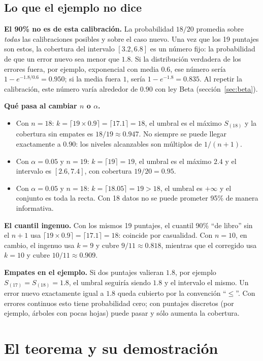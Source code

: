 \documentclass[11pt]{article}
\theoremstyle{plain}
\theoremstyle{definition}
\theoremstyle{remark}
\newcommand{\dest}[1]{\par\needspace{4\baselineskip}\textbf{#1}\quad}
\newcommand{\lamina}[1]{}%
\begin{document}
\subsection{Lo que el ejemplo no dice}
\dest{El 90\% no es de esta calibración.} La probabilidad $18/20$ promedia sobre \emph{todas} las
calibraciones posibles y sobre el caso nuevo. Una vez que los 19 puntajes son estos, la cobertura del
intervalo $[3.2,6.8]$ es un número fijo: la probabilidad de que un error nuevo sea menor que $1.8$.
Si la distribución verdadera de los errores fuera, por ejemplo, exponencial con media $0.6$, ese
número sería $1-e^{-1.8/0.6}=0.950$; si la media fuera $1$, sería $1-e^{-1.8}=0.835$. Al repetir la
calibración, este número varía alrededor de $0.90$ con ley Beta (sección~\ref{sec:beta}).

\dest{Qué pasa al cambiar $n$ o $\alpha$.}
\begin{itemize}
\item Con $n=18$: $k=\lceil19\times0.9\rceil=\lceil17.1\rceil=18$, el umbral es el máximo
$S_{(18)}$ y la cobertura sin empates es $18/19\approx0.947$. No siempre se puede llegar exactamente a
$0.90$: los niveles alcanzables son múltiplos de $1/(n+1)$.
\item Con $\alpha=0.05$ y $n=19$: $k=\lceil19\rceil=19$, el umbral es el máximo $2.4$ y el intervalo
es $[2.6,7.4]$, con cobertura $19/20=0.95$.
\item Con $\alpha=0.05$ y $n=18$: $k=\lceil18.05\rceil=19>18$, el umbral es $+\infty$ y el conjunto es
toda la recta. Con 18 datos no se puede prometer 95\% de manera informativa.
\end{itemize}

\dest{El cuantil ingenuo.} Con los mismos 19 puntajes, el cuantil 90\% ``de libro'' sin el $n+1$ usa
$\lceil19\times0.9\rceil=\lceil17.1\rceil=18$: coincide por casualidad. Con $n=10$, en cambio, el ingenuo
usa $k=9$ y cubre $9/11\approx0.818$, mientras que el corregido usa $k=10$ y cubre $10/11\approx0.909$.

\dest{Empates en el ejemplo.} Si dos puntajes valieran $1.8$, por ejemplo $S_{(17)}=S_{(18)}=1.8$, el
umbral seguiría siendo $1.8$ y el intervalo el mismo. Un error nuevo exactamente igual a $1.8$ queda
cubierto por la convención ``$\le$''. Con errores continuos esto tiene probabilidad cero; con puntajes
discretos (por ejemplo, árboles con pocas hojas) puede pasar y sólo aumenta la cobertura.

\section{El teorema y su demostración}\label{sec:teorema}\lamina{16}
\end{document}
